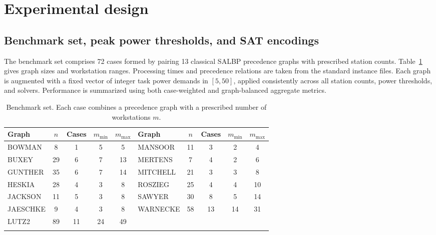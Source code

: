 \documentclass[]{interact}
\theoremstyle{plain}
\theoremstyle{definition}
\theoremstyle{remark}
\begin{document}
\section{Experimental design}
\label{sec:experiment}

\subsection{Benchmark set, peak power thresholds, and SAT encodings}

The benchmark set comprises 72 cases formed by pairing 13 classical SALBP precedence graphs with prescribed station counts. Table~\ref{tab:benchmark-inventory} gives graph sizes and workstation ranges. Processing times and precedence relations are taken from the standard instance files. Each graph is augmented with a fixed vector of integer task power demands in $[5,50]$, applied consistently across all station counts, power thresholds, and solvers. Performance is summarized using both case-weighted and graph-balanced aggregate metrics.

\begin{table}[t!]
\centering
\caption{Benchmark set. Each case combines a precedence graph with a prescribed number of workstations $m$.}
\label{tab:benchmark-inventory}
\footnotesize
\renewcommand{\arraystretch}{1.15}
\setlength{\tabcolsep}{6pt}
\begin{tabular}{@{} l c c c c @{\quad} l c c c c @{}}
\toprule
Graph & $n$ & Cases & $m_{\min}$ & $m_{\max}$ & Graph & $n$ & Cases & $m_{\min}$ & $m_{\max}$ \\
\midrule
BOWMAN & 8 & 1 & 5 & 5 & MANSOOR & 11 & 3 & 2 & 4 \\
BUXEY & 29 & 6 & 7 & 13 & MERTENS & 7 & 4 & 2 & 6 \\
GUNTHER & 35 & 6 & 7 & 14 & MITCHELL & 21 & 3 & 3 & 8 \\
HESKIA & 28 & 4 & 3 & 8 & ROSZIEG & 25 & 4 & 4 & 10 \\
JACKSON & 11 & 5 & 3 & 8 & SAWYER & 30 & 8 & 5 & 14 \\
JAESCHKE & 9 & 4 & 3 & 8 & WARNECKE & 58 & 13 & 14 & 31 \\
LUTZ2 & 89 & 11 & 24 & 49 &  &  &  &  &  \\
\addlinespace[3pt]
\multicolumn{10}{@{}c}{\textit{Total: 13 precedence graphs and 72 benchmark cases}} \\
\bottomrule
\end{tabular}
\end{table}
\end{document}
